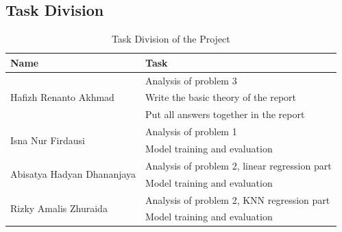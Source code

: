 \documentclass[conf]{new-aiaa}
\begin{document}
\subsection*{Task Division}
\begin{table}[p]
    \centering
    \caption{\label{tab:task_division}Task Division of the Project}
    \begin{tabular}{ll}
        \toprule
        Name & Task \\
        \midrule
        \multirow{3}{*}{Hafizh Renanto Akhmad} & Analysis of problem 3 \\
        & Write the basic theory of the report \\
        & Put all answers together in the report \\
        \midrule
        \multirow{2}{*}{Isna Nur Firdausi} & Analysis of problem 1 \\
        & Model training and evaluation \\
        \midrule
        \multirow{2}{*}{Abisatya Hadyan Dhananjaya} & Analysis of problem 2, linear regression part \\
        & Model training and evaluation \\
        \midrule
        \multirow{2}{*}{Rizky Amalis Zhuraida} & Analysis of problem 2, KNN regression part \\
        & Model training and evaluation \\
        \bottomrule
    \end{tabular}
\end{table}



\end{document}
